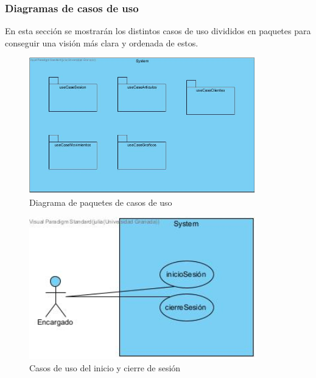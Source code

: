 \subsubsection{Diagramas de casos de uso}

En esta sección se mostrarán los distintos casos de uso divididos en paquetes para conseguir una visión más clara y ordenada de estos. 

\begin{figure}[H]
	\centering
	\includegraphics[width=0.88\textwidth]{imagenes/imagenesDiagramas/useCases/useCases.jpg}
	\caption{Diagrama de paquetes de casos de uso}
	\label{fig:usecase}
\end{figure}

\begin{figure}[H]
	\centering
	\includegraphics[width=0.88\textwidth]{imagenes/imagenesDiagramas/useCases/useCaseSesion.jpg}
	\caption{Casos de uso del inicio y cierre de sesión}
	\label{fig:usecaseSesion}
\end{figure}

